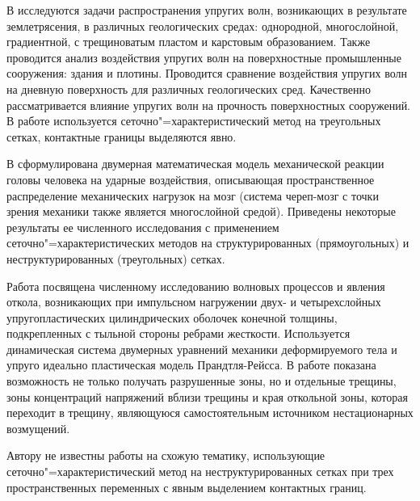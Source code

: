 В \cite{golubev_kvasov_petrov} исследуются задачи распространения упругих волн, возникающих в результате землетрясения, в различных геологических средах: однородной, многослойной, градиентной, с трещиноватым пластом и карстовым образованием. Также проводится анализ воздействия упругих волн на поверхностные промышленные сооружения: здания и плотины. Проводится сравнение воздействия упругих волн на дневную поверхность для различных геологических сред. Качественно рассматривается влияние упругих волн на прочность поверхностных сооружений. В работе используется сеточно"=характеристический метод на треугольных сетках, контактные границы выделяются явно.

В \cite{agapov_belocerkovsky_petrov} сформулирована двумерная математическая
модель механической реакции головы человека на ударные воздействия, описывающая
пространственное распределение механических нагрузок на мозг (система череп-мозг
с точки зрения механики также является многослойной средой). Приведены некоторые
результаты ее численного исследования с применением сеточно"=характеристических методов на структурированных (прямоугольных) и неструктурированных (треугольных) сетках.

Работа \cite{petrov} посвящена численному исследованию волновых процессов и явления откола, возникающих при импульсном нагружении двух- и четырехслойных упругопластических цилиндрических оболочек конечной толщины, подкрепленных с тыльной стороны ребрами жесткости. Используется динамическая система двумерных уравнений механики деформируемого тела и упруго идеально пластическая модель Прандтля-Рейсса. В работе показана возможность не только получать разрушенные зоны, но и отдельные трещины, зоны концентраций напряжений вблизи трещины и края откольной зоны, которая переходит в трещину, являющуюся самостоятельным источником нестационарных возмущений.

Автору не известны работы на схожую тематику, использующие сеточно"=характеристический метод на неструктурированных сетках при трех пространственных переменных с явным выделением контактных границ.

